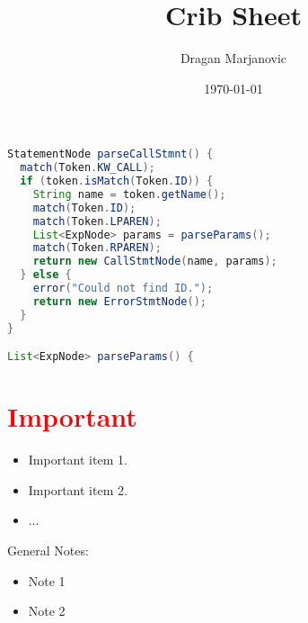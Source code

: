 \documentclass[10pt,a4paper]{article}
\title{Crib Sheet}
\date{\today}
\author{Dragan Marjanovic}
\begin{document}
\begin{landscape}
\begin{multicols}{3}

\maketitle


\begin{lstlisting}[language=Java, frame=single, morekeywords={StatementNode, List, ExpNode, String}, escapechar=!]
StatementNode parseCallStmnt() {
  match(Token.KW_CALL);
  if (token.isMatch(Token.ID)) {
    String name = token.getName();
    match(Token.ID);
    match(Token.LPAREN);
    List<ExpNode> params = parseParams();
    match(Token.RPAREN);
    return new CallStmtNode(name, params);
  } else {
    error("Could not find ID.");
    return new ErrorStmtNode();
  }
}

List<ExpNode> parseParams() {
\end{lstlisting}



\section*{\textcolor{red}{Important}} %
\label{sec:general_tips}
\begin{itemize}
	\item Important item 1.
  \item Important item 2.
  \item ...
\end{itemize}

General Notes:
\begin{itemize}
  \item Note 1
  \item Note 2
\end{itemize}

\end{multicols}
\end{landscape}
\end{document}

